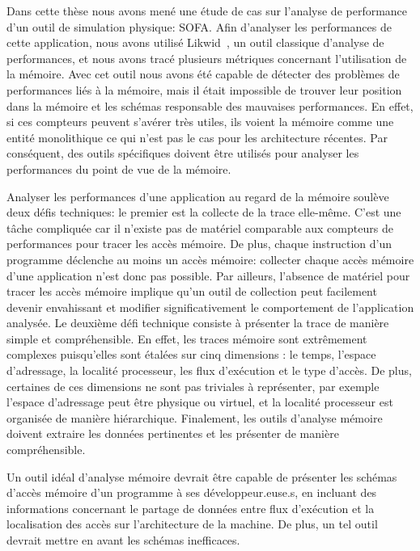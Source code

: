 Dans cette thèse nous avons mené une étude de cas sur l'analyse de performance d'un outil de simulation physique: \gls{SOFA}.
Afin d'analyser les performances de cette application, nous avons utilisé \gls{Likwid}~\cite{Treibig10LIKWID}, un outil classique d'analyse de performances, et nous avons tracé plusieurs métriques concernant l'utilisation de la mémoire.
Avec cet outil nous avons été capable de détecter  des problèmes de performances liés à la mémoire, mais il était impossible de trouver leur position dans la mémoire et les schémas responsable des mauvaises performances.
En effet, si ces compteurs peuvent s'avérer très utiles, ils voient la mémoire comme une entité monolithique ce qui n'est pas le cas pour les architecture récentes.
Par conséquent, des outils spécifiques doivent être utilisés pour analyser les performances du point de vue de la mémoire.

Analyser les performances d'une application au regard de la mémoire soulève deux défis techniques: le premier est la collecte de la trace elle-même.
C'est une t\^ache compliquée car il n'existe pas de matériel comparable aux compteurs de performances pour tracer les accès mémoire.
De plus, chaque instruction d'un programme déclenche au moins un accès mémoire: collecter chaque accès mémoire d'une application n'est donc pas possible.
Par ailleurs, l'absence de matériel pour tracer les accès mémoire implique qu'un outil de collection peut facilement devenir envahissant et modifier  significativement le comportement de l'application analysée.
Le deuxième défi technique consiste à présenter la trace de manière simple et compréhensible.
En effet, les traces mémoire sont extrêmement complexes puisqu'elles sont étalées sur cinq dimensions : le temps, l'espace d'adressage, la localité processeur, les flux d'exécution et le type d'accès.
De plus, certaines de ces dimensions ne sont pas triviales à représenter, par exemple l'espace d'adressage peut être physique ou virtuel, et la localité processeur est organisée de manière hiérarchique.
Finalement, les outils d'analyse mémoire doivent extraire les données pertinentes et les présenter de manière compréhensible.

Un outil idéal d'analyse mémoire devrait être capable de présenter les schémas d'accès mémoire d'un programme à ses développeur.euse.s, en incluant des informations concernant le partage de données entre flux d'exécution et la localisation des accès  sur l'architecture de la machine.
De plus, un tel outil devrait mettre en avant les schémas inefficaces.

